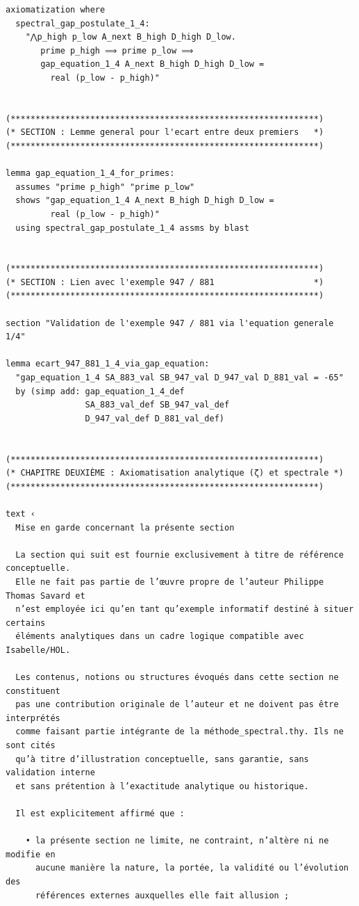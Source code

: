 \documentclass[a4paper,11pt]{article}
\begin{document}
\begin{holcode}[title={\textcolor{white}{Fichier : methode\_spectral.thy -- Partie 1/4}}]
\begin{lstlisting}
axiomatization where
  spectral_gap_postulate_1_4:
    "⋀p_high p_low A_next B_high D_high D_low.
       prime p_high ⟹ prime p_low ⟹
       gap_equation_1_4 A_next B_high D_high D_low =
         real (p_low - p_high)"


(**************************************************************)
(* SECTION : Lemme general pour l'ecart entre deux premiers   *)
(**************************************************************)

lemma gap_equation_1_4_for_primes:
  assumes "prime p_high" "prime p_low"
  shows "gap_equation_1_4 A_next B_high D_high D_low =
         real (p_low - p_high)"
  using spectral_gap_postulate_1_4 assms by blast


(**************************************************************)
(* SECTION : Lien avec l'exemple 947 / 881                    *)
(**************************************************************)

section "Validation de l'exemple 947 / 881 via l'equation generale 1/4"

lemma ecart_947_881_1_4_via_gap_equation:
  "gap_equation_1_4 SA_883_val SB_947_val D_947_val D_881_val = -65"
  by (simp add: gap_equation_1_4_def
                SA_883_val_def SB_947_val_def
                D_947_val_def D_881_val_def)


(**************************************************************)
(* CHAPITRE DEUXIÈME : Axiomatisation analytique (ζ) et spectrale *)
(**************************************************************)

text ‹
  Mise en garde concernant la présente section

  La section qui suit est fournie exclusivement à titre de référence conceptuelle.
  Elle ne fait pas partie de l’œuvre propre de l’auteur Philippe Thomas Savard et
  n’est employée ici qu’en tant qu’exemple informatif destiné à situer certains
  éléments analytiques dans un cadre logique compatible avec Isabelle/HOL.

  Les contenus, notions ou structures évoqués dans cette section ne constituent
  pas une contribution originale de l’auteur et ne doivent pas être interprétés
  comme faisant partie intégrante de la méthode_spectral.thy. Ils ne sont cités
  qu’à titre d’illustration conceptuelle, sans garantie, sans validation interne
  et sans prétention à l’exactitude analytique ou historique.

  Il est explicitement affirmé que :

    • la présente section ne limite, ne contraint, n’altère ni ne modifie en
      aucune manière la nature, la portée, la validité ou l’évolution des
      références externes auxquelles elle fait allusion ;


\end{lstlisting}
\end{holcode}
\end{document}
